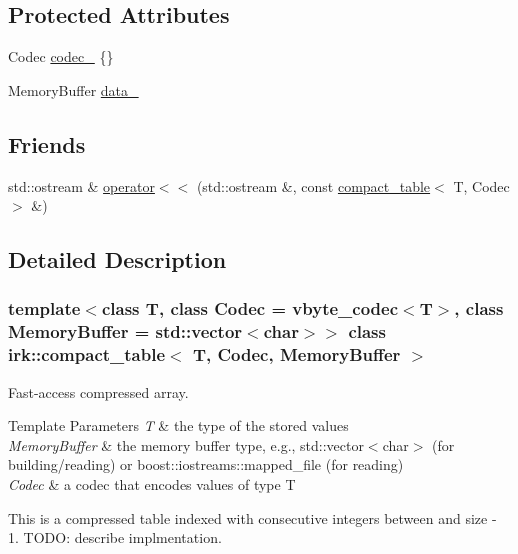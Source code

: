 \subsection*{Protected Attributes}
\begin{DoxyCompactItemize}
\item 
Codec \mbox{\hyperlink{classirk_1_1compact__table_aeac5fcd509fae2f16e455fc6a37eb1d3}{codec\+\_\+}} \{\}
\item 
Memory\+Buffer \mbox{\hyperlink{classirk_1_1compact__table_a8a8f2eccb0ccc0258c158c51dfbfdbaa}{data\+\_\+}}
\end{DoxyCompactItemize}
\subsection*{Friends}
\begin{DoxyCompactItemize}
\item 
std\+::ostream \& \mbox{\hyperlink{classirk_1_1compact__table_aabbde77b5cb5faeef5fe72eff9624aa5}{operator$<$$<$}} (std\+::ostream \&, const \mbox{\hyperlink{classirk_1_1compact__table}{compact\+\_\+table}}$<$ T, Codec $>$ \&)
\end{DoxyCompactItemize}


\subsection{Detailed Description}
\subsubsection*{template$<$class T, class Codec = vbyte\+\_\+codec$<$\+T$>$, class Memory\+Buffer = std\+::vector$<$char$>$$>$\newline
class irk\+::compact\+\_\+table$<$ T, Codec, Memory\+Buffer $>$}

Fast-\/access compressed array. 


\begin{DoxyTemplParams}{Template Parameters}
{\em T} & the type of the stored values \\
\hline
{\em Memory\+Buffer} & the memory buffer type, e.\+g., {\ttfamily std\+::vector$<$char$>$} (for building/reading) or {\ttfamily boost\+::iostreams\+::mapped\+\_\+file} (for reading) \\
\hline
{\em Codec} & a codec that encodes values of type {\ttfamily T}\\
\hline
\end{DoxyTemplParams}
This is a compressed table indexed with consecutive integers between {} and {\ttfamily size -\/ 1}. T\+O\+DO\+: describe implmentation.

